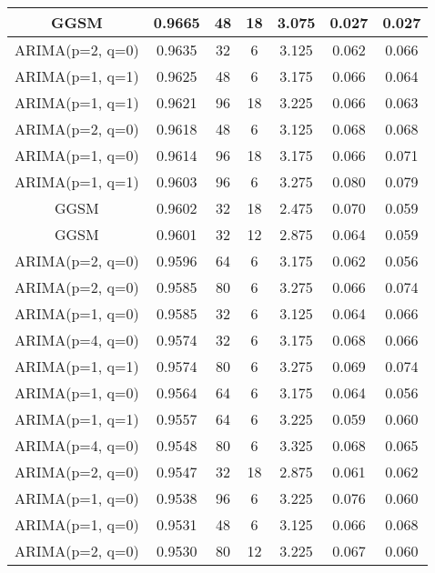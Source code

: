 \begin{table*}[th!]
\begin{tabular}{|c|c|c|c|c|c|c|}
        \hline
        GGSM & 0.9665 & 48 & 18 & 3.075 &  0.027 & 0.027 \\
        \hline
        ARIMA(p=2, q=0) & 0.9635 & 32 & 6 & 3.125 &  0.062 & 0.066 \\
        \hline
        ARIMA(p=1, q=1) & 0.9625 & 48 & 6 & 3.175 &  0.066 & 0.064 \\
        \hline
        ARIMA(p=1, q=1) & 0.9621 & 96 & 18 & 3.225 &  0.066 & 0.063 \\
        \hline
        ARIMA(p=2, q=0) & 0.9618 & 48 & 6 & 3.125 &  0.068 & 0.068 \\
        \hline
        ARIMA(p=1, q=0) & 0.9614 & 96 & 18 & 3.175 &  0.066 & 0.071 \\
        \hline
        ARIMA(p=1, q=1) & 0.9603 & 96 & 6 & 3.275 &  0.080 & 0.079 \\
        \hline
        GGSM & 0.9602 & 32 & 18 & 2.475 &  0.070 & 0.059 \\
        \hline
        GGSM & 0.9601 & 32 & 12 & 2.875 &  0.064 & 0.059 \\
        \hline
        ARIMA(p=2, q=0) & 0.9596 & 64 & 6 & 3.175 &  0.062 & 0.056 \\
        \hline
        ARIMA(p=2, q=0) & 0.9585 & 80 & 6 & 3.275 &  0.066 & 0.074 \\
        \hline
        ARIMA(p=1, q=0) & 0.9585 & 32 & 6 & 3.125 &  0.064 & 0.066 \\
        \hline
        ARIMA(p=4, q=0) & 0.9574 & 32 & 6 & 3.175 &  0.068 & 0.066 \\
        \hline
        ARIMA(p=1, q=1) & 0.9574 & 80 & 6 & 3.275 &  0.069 & 0.074 \\
        \hline
        ARIMA(p=1, q=0) & 0.9564 & 64 & 6 & 3.175 &  0.064 & 0.056 \\
        \hline
        ARIMA(p=1, q=1) & 0.9557 & 64 & 6 & 3.225 &  0.059 & 0.060 \\
        \hline
        ARIMA(p=4, q=0) & 0.9548 & 80 & 6 & 3.325 &  0.068 & 0.065 \\
        \hline
        ARIMA(p=2, q=0) & 0.9547 & 32 & 18 & 2.875 &  0.061 & 0.062 \\
        \hline
        ARIMA(p=1, q=0) & 0.9538 & 96 & 6 & 3.225 &  0.076 & 0.060 \\
        \hline
        ARIMA(p=1, q=0) & 0.9531 & 48 & 6 & 3.125 &  0.066 & 0.068 \\
        \hline
        ARIMA(p=2, q=0) & 0.9530 & 80 & 12 & 3.225 &  0.067 & 0.060 \\
        \hline

\end{tabular}
\end{table*}
